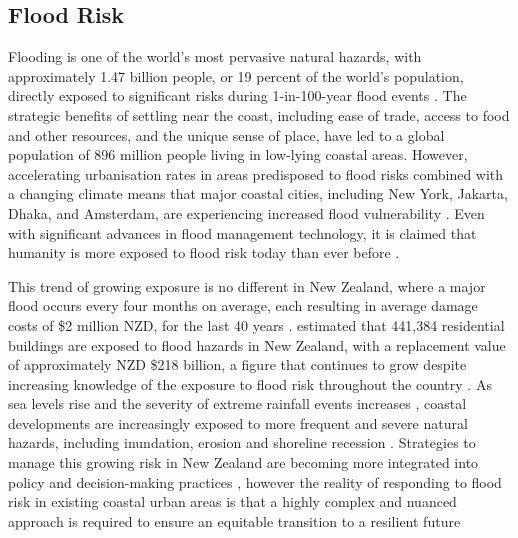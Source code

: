 \subsection{Flood Risk}
Flooding is one of the world’s most pervasive natural hazards, with
approximately 1.47 billion people, or 19 percent of the world’s population,
directly exposed to significant risks during 1-in-100-year flood events
\parencite{IPCC2023}. The strategic benefits of settling near the coast,
including ease of trade, access to food and other resources, and the unique
sense of place, have led to a global population of 896 million people living in
low-lying coastal areas. However, accelerating urbanisation rates in areas
predisposed to flood risks combined with a changing climate means that major
coastal cities, including New York, Jakarta, Dhaka, and Amsterdam, are
experiencing increased flood vulnerability \parencite{Caljouw2009, Haque2010,
Kim2019, Madajewicz2020}. Even with significant advances in flood management
technology, it is claimed that humanity is more exposed to flood risk today than
ever before \parencite{White2013}.

This trend of growing exposure is no different in New Zealand, where a major
flood occurs every four months on average, each resulting in average damage
costs of \$2 million NZD, for the last 40 years \parencite{CrawfordFlett2022}.
\textcite{Paulik2023} estimated that 441,384 residential buildings are exposed
to flood hazards in New Zealand, with a replacement value of approximately NZD
\$218 billion, a figure that continues to grow despite increasing knowledge of
the exposure to flood risk throughout the country \parencite{Levy2023,
Naish2024, Paulik2023, Hughes2015}. As sea levels rise and the severity of
extreme rainfall events increases \parencite{MfE2023}, coastal developments are
increasingly exposed to more frequent and severe natural hazards, including
inundation, erosion and shoreline recession \parencite{Storey2024}. Strategies
to manage this growing risk in New Zealand are becoming more integrated into
policy and decision-making practices \parencite{Schneider2020, Storey2024,
Storey2025}, however the reality of responding to flood risk in existing coastal
urban areas is that a highly complex and nuanced approach is required to ensure
an equitable transition to a resilient future \parencite{Hughes2015, Logan2020} 

